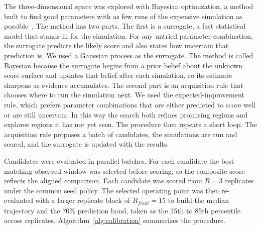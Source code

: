 \documentclass[applsci,article,accept,pdftex,moreauthors]{Definitions/mdpi}
\begin{document}
The three-dimensional space was explored with Bayesian optimization, a method built to find good parameters with as few runs of the expensive simulation as possible~\cite{machinelear,andrianakis2015historymatching}. The method has two parts. The first is a surrogate, a fast statistical model that stands in for the simulation. For any untried parameter combination, the surrogate predicts the likely score and also states how uncertain that prediction is. We used a Gaussian process as the surrogate. The method is called Bayesian because the surrogate begins from a prior belief about the unknown score surface and updates that belief after each simulation, so its estimate sharpens as evidence accumulates. The second part is an acquisition rule that chooses where to run the simulation next. We used the expected-improvement rule, which prefers parameter combinations that are either predicted to score well or are still uncertain. In this way the search both refines promising regions and explores regions it has not yet seen. The procedure then repeats a short loop. The acquisition rule proposes a batch of candidates, the simulations are run and scored, and the surrogate is updated with the results.

Candidates were evaluated in parallel batches. For each candidate the best-matching observed window was selected before scoring, so the composite score reflects the aligned comparison. Each candidate was scored from $R=3$ replicates under the common seed policy. The selected operating point was then re-evaluated with a larger replicate block of $R_{\mathit{final}}=15$ to build the median trajectory and the 70\% prediction band, taken as the 15th to 85th percentile across replicates. Algorithm~\ref{alg:calibration} summarizes the procedure.
\end{document}
